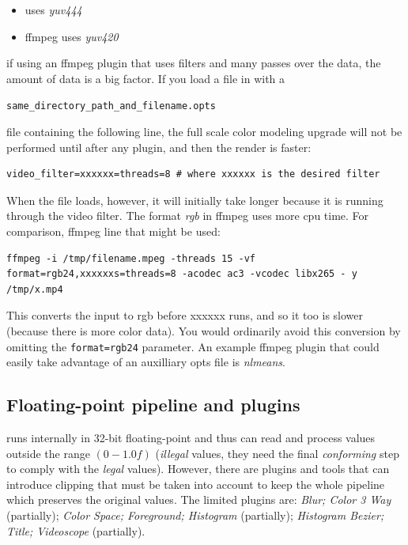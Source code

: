 \begin{itemize}[noitemsep]
    \item \CGG{} uses \textit{yuv444}
    \item ffmpeg uses \textit{yuv420}
\end{itemize}

if using an ffmpeg plugin that uses filters and many passes over the data, the amount of data is a big factor. If you load a file in \CGG{} with a

\texttt{same\_directory\_path\_and\_filename.opts}

file containing the following line, the full scale color modeling upgrade will not be performed until after any plugin, and then the render is faster:

\begin{lstlisting}[style=sh]
video_filter=xxxxxx=threads=8 # where xxxxxx is the desired filter
\end{lstlisting}

When the file loads, however, it will initially take longer because it is running through the video filter. The format \textit{rgb} in ffmpeg uses more cpu time. For comparison, ffmpeg line that might be used:

\begin{lstlisting}[style=sh]
ffmpeg -i /tmp/filename.mpeg -threads 15 -vf format=rgb24,xxxxxxs=threads=8 -acodec ac3 -vcodec libx265 - y /tmp/x.mp4
\end{lstlisting}

This converts the input to rgb before xxxxxx runs, and so it too is slower (because there is more color data). You would ordinarily avoid this conversion by omitting the \texttt{format=rgb24} parameter. An example ffmpeg plugin that could easily take advantage of an auxilliary opts file is \textit{nlmeans}.

\subsection{Floating-point pipeline and plugins}%
\label{sub:pipeline_fp_plugins}

\CGG{} runs internally in 32-bit floating-point and thus can read and process values outside the range $(0 - 1.0f)$ (\textit{illegal} values, they need the final \textit{conforming} step to comply with the \textit{legal} values). However, there are plugins and tools that can introduce clipping that must be taken into account to keep the whole pipeline which preserves the original values. The limited plugins are: \textit{Blur; Color 3 Way} (partially); \textit{Color Space; Foreground; Histogram} (partially); \textit{Histogram Bezier; Title; Videoscope} (partially).

